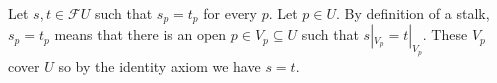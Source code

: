 Let $s, t \in \mathcal{F}U$ such that $s_p = t_p$ for every $p$. Let $p \in U$.
By definition of a stalk, $s_p = t_p$ means that there is an open $p \in V_p \subseteq U$
such that $s|_{V_p} = t|_{V_p}$. These $V_p$ cover $U$ so by the identity axiom
we have $s = t$.
